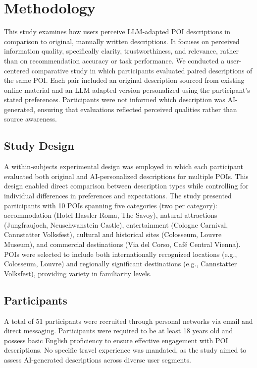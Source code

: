 \section{Methodology}
This study examines how users perceive LLM-adapted POI descriptions in comparison to original, manually written descriptions. It focuses on perceived information quality, specifically clarity, trustworthiness, and relevance, rather than on recommendation accuracy or task performance. We conducted a user-centered comparative study in which participants evaluated paired descriptions of the same POI. Each pair included an original description sourced from existing online material and an LLM-adapted version personalized using the participant’s stated preferences. Participants were not informed which description was AI-generated, ensuring that evaluations reflected perceived qualities rather than source awareness.

\subsection{Study Design}
A within-subjects experimental design was employed in which each participant evaluated both original and AI-personalized descriptions for multiple POIs. This design enabled direct comparison between description types while controlling for individual differences in preferences and expectations. The study presented participants with 10 POIs spanning five categories (two per category): accommodation (Hotel Hassler Roma, The Savoy), natural attractions (Jungfraujoch, Neuschwanstein Castle), entertainment (Cologne Carnival, Cannstatter Volksfest), cultural and historical sites (Colosseum, Louvre Museum), and commercial destinations (Via del Corso, Caf\'{e} Central Vienna). POIs were selected to include both internationally recognized locations (e.g., Colosseum, Louvre) and regionally significant destinations (e.g., Cannstatter Volksfest), providing variety in familiarity levels.

\subsection{Participants}
A total of 51 participants were recruited through personal networks via email and direct messaging. Participants were required to be at least 18 years old and possess basic English proficiency to ensure effective engagement with POI descriptions. No specific travel experience was mandated, as the study aimed to assess AI-generated descriptions across diverse user segments.

